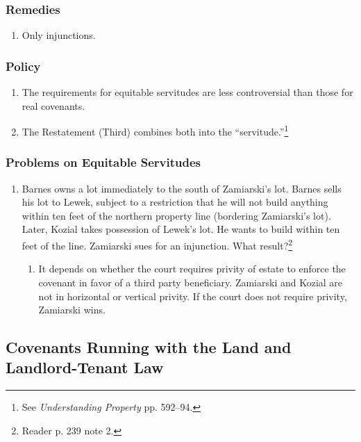 \subsubsection{Remedies}

\begin{enumerate}
    \item Only injunctions.
\end{enumerate}

\subsubsection{Policy}

\begin{enumerate}
    \item The requirements for equitable servitudes are less controversial 
    than those for real covenants.
    \item The Restatement (Third) combines both into the 
    ``servitude.''\footnote{See \emph{Understanding Property} pp. 592--94.}
\end{enumerate}

\subsubsection{Problems on Equitable Servitudes}

\begin{enumerate}
    \item Barnes owns a lot immediately to the south of Zamiarski's lot. 
    Barnes sells his lot to Lewek, subject to a restriction that he will not 
    build anything within ten feet of the northern property line (bordering 
    Zamiarski's lot). Later, Kozial takes possession of Lewek's lot. He wants 
    to build within ten feet of the line. Zamiarski sues for an injunction. 
    What result?\footnote{Reader p. 239 note 2.}
    \begin{enumerate}
        \item It depends on whether the court requires privity of estate to 
        enforce the covenant in favor of a third party beneficiary. Zamiarski 
        and Kozial are not in horizontal or vertical privity. If the court 
        does not require privity, Zamiarski wins.
    \end{enumerate}
\end{enumerate}

\subsection{Covenants Running with the Land and Landlord-Tenant Law}

